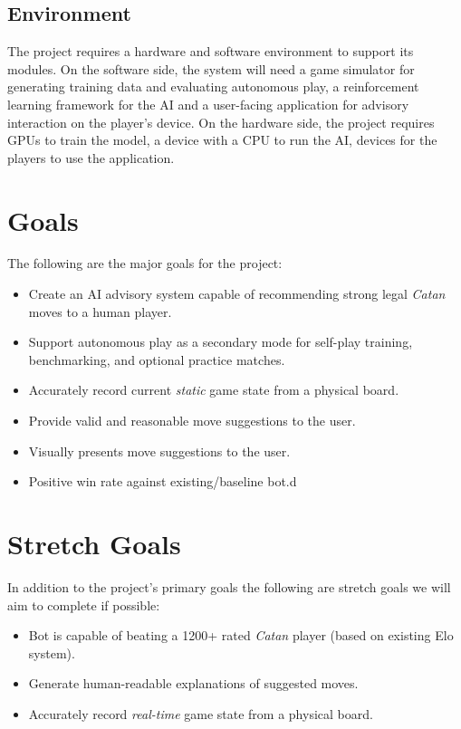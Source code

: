 \documentclass{article}
\begin{document}
\subsection{Environment}\label{subsec:environment}
The project requires a hardware and software environment to support its modules.
On the software side, the system will need a game simulator for generating training data and evaluating autonomous play, 
a reinforcement learning framework for the AI and a user-facing application for advisory interaction on the player's device.
On the hardware side, the project requires GPUs to train the model, a device with a CPU to run the AI, 
devices for the players to use the application.

\section{Goals}\label{sec:goals}
The following are the major goals for the project:
\begin{itemize}
    \item Create an AI advisory system capable of recommending strong legal \emph{Catan} moves to a human player.
    \item Support autonomous play as a secondary mode for self-play training, benchmarking, and optional practice matches.
    \item Accurately record current \emph{static} game state from a physical board.
    \item Provide valid and reasonable move suggestions to the user.
    \item Visually presents move suggestions to the user.
    \item Positive win rate against existing/baseline bot.d
\end{itemize}

\section{Stretch Goals}\label{sec:stretch-goals}
In addition to the project’s primary goals the following are stretch goals we will aim to complete if possible:
\begin{itemize}
    \item Bot is capable of beating a 1200+ rated \emph{Catan} player (based on existing Elo system).
    \item Generate human-readable explanations of suggested moves.
    \item Accurately record \emph{real-time} game state from a physical board.
\end{itemize}
\end{document}
